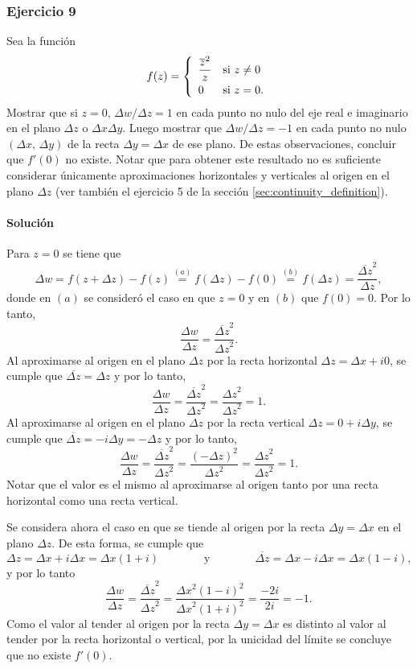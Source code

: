 \documentclass[a4paper]{report}
\begin{document}
\subsubsection{Ejercicio 9}
 
Sea la función 
\[
 f(z)=\left\{ 
 \begin{array}{ll}
  \dfrac{\overline{z}^2}{z} & \textrm{si }z\neq0\\[\medskipamount]
  0 & \textrm{si }z=0.
 \end{array}
 \right.
\]
Mostrar que si \(z=0\), \(\Delta w/\Delta z=1\) en cada punto no nulo del eje real e imaginario en el plano \(\Delta z\) o \(\Delta x\Delta y\). Luego mostrar que \(\Delta w/\Delta z=-1\) en cada punto no nulo \((\Delta x,\,\Delta y)\) de la recta \(\Delta y=\Delta x\) de ese plano. De estas observaciones, concluir que \(f'(0)\) no existe. Notar que para obtener este resultado no es suficiente considerar únicamente aproximaciones horizontales y verticales al origen en el plano \(\Delta z\) (ver también el ejercicio 5 de la sección \ref{sec:continuity_definition}).
 
\paragraph{Solución} Para \(z=0\) se tiene que 
\[
 \Delta w=f(z+\Delta z)-f(z)\overset{(a)}{=}f(\Delta z)-f(0)\overset{(b)}{=}f(\Delta z)=\frac{\overline{\Delta z}^2}{\Delta z},
\]
donde en \((a)\) se consideró el caso en que \(z=0\) y en \((b)\) que \(f(0)=0\). Por lo tanto,
\[
 \frac{\Delta w}{\Delta z}=\frac{\overline{\Delta z}^2}{{\Delta z}^2}.
\]
Al aproximarse al origen en el plano \(\Delta z\) por la recta horizontal \(\Delta z=\Delta x+i0\),  se cumple que \(\overline{\Delta z}=\Delta z\) y por lo tanto,
\[
 \frac{\Delta w}{\Delta z}=\frac{\overline{\Delta z}^2}{{\Delta z}^2}=\frac{{\Delta z}^2}{{\Delta z}^2}=1.
\]
Al aproximarse al origen en el plano \(\Delta z\) por la recta vertical \(\Delta z=0+i\Delta y\), se cumple que \(\overline{\Delta z}=-i\Delta y=-\Delta z\) y por lo tanto,
\[
 \frac{\Delta w}{\Delta z}=\frac{\overline{\Delta z}^2}{{\Delta z}^2}=\frac{(-\Delta z)^2}{{\Delta z}^2}=\frac{{\Delta z}^2}{{\Delta z}^2}=1.
\]
Notar que el valor es el mismo al aproximarse al origen tanto por una recta horizontal como una recta vertical. 

Se considera ahora el caso en que se tiende al origen por la recta \(\Delta y=\Delta x\) en el plano \(\Delta z\). De esta forma, se cumple que 
\[
 \Delta z=\Delta x+i\Delta x=\Delta x(1+i)
 \qquad\qquad\textrm{y}\qquad\qquad
 \overline{\Delta z}=\Delta x-i\Delta x=\Delta x(1-i),
\]
y por lo tanto
\[
 \frac{\Delta w}{\Delta z}=\frac{\overline{\Delta z}^2}{{\Delta z}^2}
  =\frac{{\Delta x}^2(1-i)^2}{{\Delta x}^2(1+i)^2}=\frac{-2i}{2i}=-1.
\]
Como el valor al tender al origen por la recta \(\Delta y=\Delta x\) es distinto al valor al tender por la recta horizontal o vertical, por la unicidad del límite se concluye que no existe \(f'(0)\).
\end{document}
